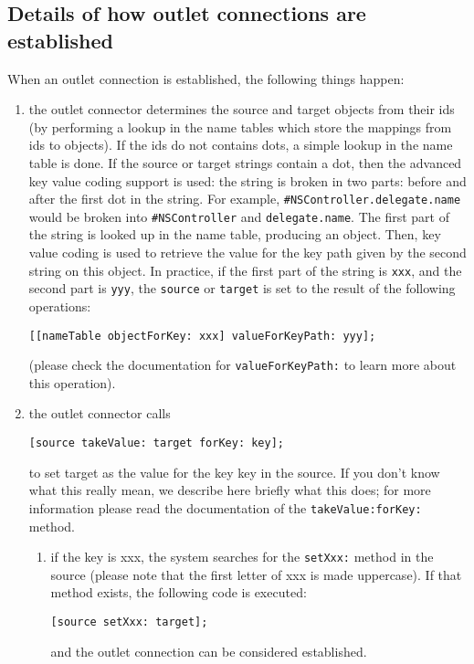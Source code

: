 \subsection{Details of how outlet connections are established}
When an outlet connection is established, the following things happen:
\begin{enumerate}
\item the outlet connector determines the source and target objects
  from their ids (by performing a lookup in the name tables which
  store the mappings from ids to objects).  If the ids do not contains
  dots, a simple lookup in the name table is done.  If the source or
  target strings contain a dot, then the advanced key value coding
  support is used: the string is broken in two parts: before and after
  the first dot in the string.  For example,
  \texttt{\#NSController.delegate.name} would be broken into
  \texttt{\#NSController} and \texttt{delegate.name}.  The first part
  of the string is looked up in the name table, producing an object.
  Then, key value coding is used to retrieve the value for the key
  path given by the second string on this object.  In practice, if the
  first part of the string is \texttt{xxx}, and the second part is
  \texttt{yyy}, the \texttt{source} or \texttt{target} is set to the
  result of the following operations:
\begin{verbatim}
[[nameTable objectForKey: xxx] valueForKeyPath: yyy];
\end{verbatim}
  (please check the documentation for \texttt{valueForKeyPath:} to
learn more about this operation).
\item the outlet connector calls
\begin{verbatim}
[source takeValue: target forKey: key];
\end{verbatim}
  to set target as the value for the key key in the source.  If you
  don't know what this really mean, we describe here briefly what this
  does; for more information please read the documentation of the
  \texttt{takeValue:forKey:} method.
\begin{enumerate}
\item if the key is xxx, the system searches for the \texttt{setXxx:}
  method in the source (please note that the first letter of xxx is
  made uppercase).  If that method exists, the following code is
  executed:
\begin{verbatim}
[source setXxx: target];
\end{verbatim}
  and the outlet connection can be considered established.

\end{enumerate}
\end{enumerate}
